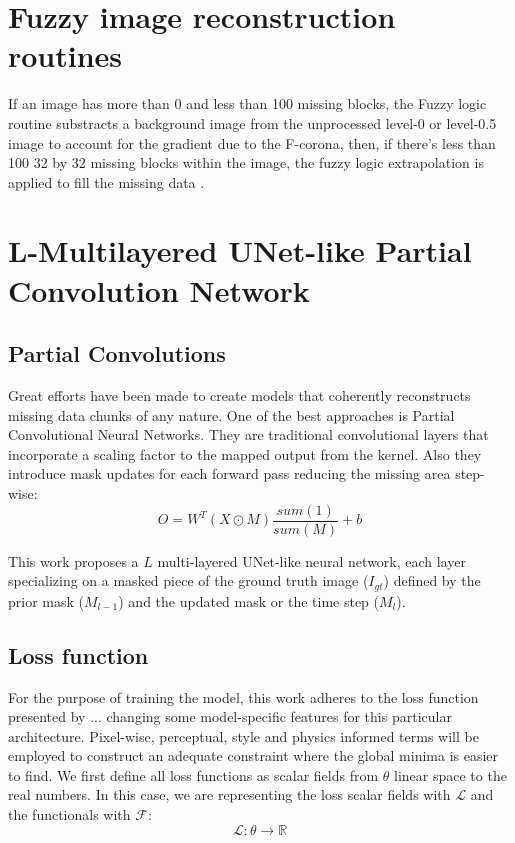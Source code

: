 \documentclass[draft]{agujournal2019}
\begin{document}
\section{Fuzzy image reconstruction routines}
    If an image has more than 0 and less than 100 missing blocks, the Fuzzy logic routine substracts a background image from the unprocessed level-0 or level-0.5 image to account for the gradient due to the F-corona, then, if there's less than 100 32 by 32 missing blocks within the image, the fuzzy logic extrapolation is applied to fill the missing data \cite{morrill2006calibration}.

\section{L-Multilayered UNet-like Partial Convolution Network}

\subsection{Partial Convolutions}
Great efforts have been made to create models that coherently reconstructs missing data chunks of any nature. One of the best approaches is Partial Convolutional Neural Networks. They are traditional convolutional layers that incorporate a scaling factor to the mapped output from the kernel. Also they introduce mask updates for each forward pass reducing the missing area step-wise:
\begin{equation}
    O = W^T(X \odot M)\frac{sum(1)}{sum(M)} + b
\end{equation}

This work proposes a $L$ multi-layered UNet-like neural network, each layer specializing on a masked piece of the ground truth image ($I_{gt}$) defined by the prior mask ($M_{l-1}$) and the updated mask or the time step ($M_{l}$).

\subsection{Loss function}
For the purpose of training the model, this work adheres to the loss function presented by ... changing some model-specific features for this particular architecture. Pixel-wise, perceptual, style and physics informed terms will be employed to construct an adequate constraint where the global minima is easier to find. We first define all loss functions as scalar fields from \textbf{$\theta$} linear space to the real numbers. In this case, we are representing the loss scalar fields with $\mathcal{L}$ and the functionals with $\boldsymbol{\mathcal{F}}$:
\begin{equation}
    \mathcal{L} : \theta \to \mathbb{R}
\end{equation}
\end{document}
